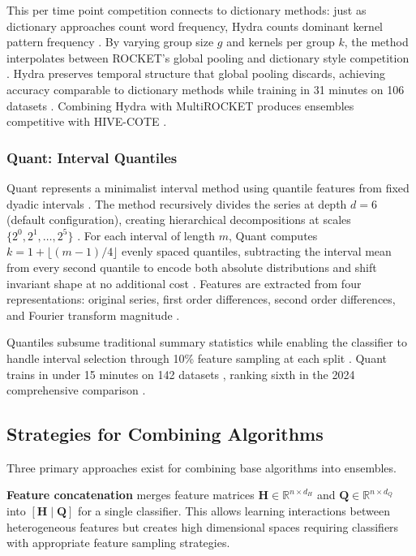 \documentclass[pdflatex,sn-basic]{sn-jnl}           %
\theoremstyle{thmstyleone}%
\theoremstyle{thmstyletwo}%
\theoremstyle{thmstylethree}%
\begin{document}
This per time point competition connects to dictionary methods: just as dictionary approaches count word frequency, Hydra counts dominant kernel pattern frequency \citep[p.~1786]{hydra}. By varying group size $g$ and kernels per group $k$, the method interpolates between ROCKET's global pooling and dictionary style competition \citep[Figure~2, p.~1791]{hydra}. Hydra preserves temporal structure that global pooling discards, achieving accuracy comparable to dictionary methods while training in 31 minutes on 106 datasets \citep[p.~1781]{hydra}. Combining Hydra with MultiROCKET produces ensembles competitive with HIVE-COTE \citep[pp.~1796--1797]{hydra}.

\subsubsection{Quant: Interval Quantiles}

Quant represents a minimalist interval method using quantile features from fixed dyadic intervals \citep{quant}. The method recursively divides the series at depth $d=6$ (default configuration), creating hierarchical decompositions at scales $\{2^0, 2^1, \ldots, 2^5\}$ \citep[p.~2384]{quant}. For each interval of length $m$, Quant computes $k = 1 + \lfloor (m-1)/4 \rfloor$ evenly spaced quantiles, subtracting the interval mean from every second quantile to encode both absolute distributions and shift invariant shape at no additional cost \citep[p.~2385, Figure~4, p.~2386]{quant}. Features are extracted from four representations: original series, first order differences, second order differences, and Fourier transform magnitude \citep[Section~3.1, p.~2384]{quant}.

Quantiles subsume traditional summary statistics \citep[p.~2378]{quant} while enabling the classifier to handle interval selection through 10\% feature sampling at each split \citep[Section~4.2.6, p.~2387]{quant}. Quant trains in under 15 minutes on 142 datasets \citep[p.~2390]{quant}, ranking sixth in the 2024 comprehensive comparison \citep[Table~14, p.~2008]{bakeoff-redux}.

\subsection{Strategies for Combining Algorithms}

Three primary approaches exist for combining base algorithms into ensembles. 

\textbf{Feature concatenation} merges feature matrices $\mathbf{H} \in \mathbb{R}^{n \times d_H}$ and $\mathbf{Q} \in \mathbb{R}^{n \times d_Q}$ into $[\mathbf{H} \mid \mathbf{Q}]$ for a single classifier. This allows learning interactions between heterogeneous features but creates high dimensional spaces requiring classifiers with appropriate feature sampling strategies.
\end{document}
